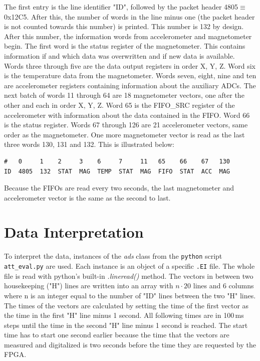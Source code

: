 The first entry is the line identifier "ID", followed by the packet header 4805$\equiv$0x12C5. After this, the number of words in the line minus one (the packet header is not counted towards this number) is printed. This number is 132 by design. After this number, the information words from accelerometer and magnetometer begin. The first word is the status register of the magnetometer. This contains information if and which data was overwritten and if new data is available. Words three through five are the data output registers in order X, Y, Z. Word six is the temperature data from the magnetometer. Words seven, eight, nine and ten are accelerometer registers containing information about the auxiliary \acp{ADC}. The next batch of words 11 through 64 are 18 magnetometer vectors, one after the other and each in order X, Y, Z. Word 65 is the FIFO\_SRC register of the accelerometer with information about the data contained in the \ac{FIFO}. Word 66 is the status register. Words 67 through 126 are 21 accelerometer vectors, same order as the magnetometer. One more magnetometer vector is read as the last three words 130, 131 and 132. This is illustrated below:
\begin{lstlisting}
#   0     1    2     3    6     7     11   65    66    67   130
ID  4805  132  STAT  MAG  TEMP  STAT  MAG  FIFO  STAT  ACC  MAG
\end{lstlisting}

Because the \acp{FIFO} are read every two seconds, the last magnetometer and accelerometer vector is the same as the second to last.

\section{Data Interpretation \label{sec:meth:data_interpretation}}
To interpret the data, instances of the \textit{ads} class from the \verb|python| script \verb|att_eval.py| are used. Each instance is an object of a specific \verb|.EI| file. The whole file is read with python's built-in \textit{.lineread()} method. The vectors in between two housekeeping ("H") lines are written into an array with $n\cdot20$ lines and 6 columns where n is an integer equal to the number of "ID" lines between the two "H" lines. The times of the vectors are calculated by setting the time of the first vector as the time in the first "H" line minus 1 second. All following times are in 100\,ms steps until the time in the second "H" line minus 1 second is reached. The start time has to start one second earlier because the time that the vectors are measured and digitalized is two seconds before the time they are requested by the \ac{FPGA}.

